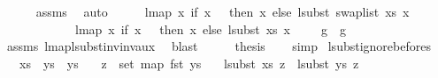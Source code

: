 \begin{isabellebody}
\ \ \ \ \isamarkupfalse%
\ assms{\isacharparenleft}{\kern0pt}{}{\isacharparenright}{\kern0pt}\ \isamarkupfalse%
\ auto\isanewline
\ \ \isamarkupfalse%
\ \isamarkupfalse%
\ {\isachardoublequoteopen}lmap\ {\isacharparenleft}{\kern0pt}{\isasymlambda}x{\isachardot}{\kern0pt}\ if\ x\ {\isacharless}{\kern0pt}\ {}\ then\ x\ else\ {\isacharparenleft}{\kern0pt}lsubst\ {\isacharparenleft}{\kern0pt}swap{\isacharunderscore}{\kern0pt}list\ xs{\isacharparenright}{\kern0pt}\ {\isacharparenleft}{\kern0pt}x\ {\isacharminus}{\kern0pt}\ {}{\isacharparenright}{\kern0pt}\ {\isacharplus}{\kern0pt}\ {}{\isacharparenright}{\kern0pt}{\isacharparenright}{\kern0pt}\isanewline
\ \ \ \ \ \ \ \ \ \ \ \ {\isacharparenleft}{\kern0pt}lmap\ {\isacharparenleft}{\kern0pt}{\isasymlambda}x{\isachardot}{\kern0pt}\ if\ x\ {\isacharless}{\kern0pt}\ {}\ then\ x\ else\ {\isacharparenleft}{\kern0pt}lsubst\ xs\ {\isacharparenleft}{\kern0pt}x\ {\isacharminus}{\kern0pt}\ {}{\isacharparenright}{\kern0pt}\ {\isacharplus}{\kern0pt}\ {}{\isacharparenright}{\kern0pt}{\isacharparenright}{\kern0pt}\ g{\isacharparenright}{\kern0pt}\ {\isacharequal}{\kern0pt}\ g{\isachardoublequoteclose}\isanewline
\ \ \ \ \isamarkupfalse%
\ assms{\isacharparenleft}{\kern0pt}{}{\isacharcomma}{\kern0pt}{}{\isacharparenright}{\kern0pt}\ lmap{\isacharunderscore}{\kern0pt}lsubst{\isacharunderscore}{\kern0pt}inv{\isacharunderscore}{\kern0pt}inv{\isacharunderscore}{\kern0pt}aux\ \isamarkupfalse%
\ blast\isanewline
\ \ \isamarkupfalse%
\ \isamarkupfalse%
\ {\isacharquery}{\kern0pt}thesis\isanewline
\ \ \isamarkupfalse%
\ simp\isanewline
{}\isamarkupfalse%
%
\endisatagproof
{\isafoldproof}%
%
\isadelimproof
\isanewline
%
\endisadelimproof
\isanewline
\isanewline
\isanewline
\isanewline
\isanewline
{}\isamarkupfalse%
\ lsubst{\isacharunderscore}{\kern0pt}ignore{\isacharunderscore}{\kern0pt}befores{\isacharcolon}{\kern0pt}\isanewline
\ \ \ {\isachardoublequoteopen}xs\ {\isacharequal}{\kern0pt}\ ys{}\ {\isacharat}{\kern0pt}\ ys{}{\isachardoublequoteclose}\isanewline
\ \ \ {\isachardoublequoteopen}z\ {\isasymnotin}\ set\ {\isacharparenleft}{\kern0pt}map\ fst\ ys{}{\isacharparenright}{\kern0pt}{\isachardoublequoteclose}\isanewline
\ \ \ {\isachardoublequoteopen}lsubst\ xs\ z\ {\isacharequal}{\kern0pt}\ lsubst\ ys{}\ z{\isachardoublequoteclose}\isanewline

\end{isabellebody}
